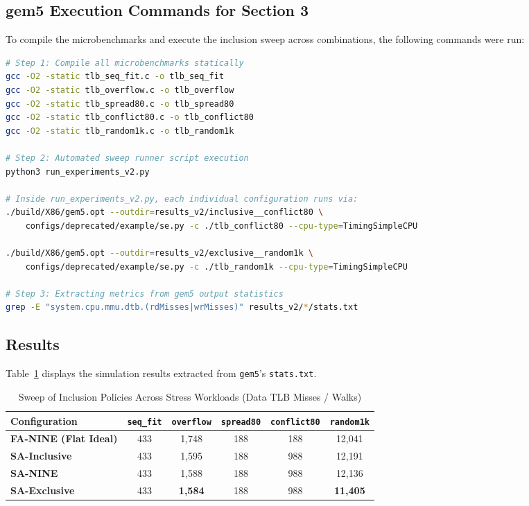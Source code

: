 \subsection{gem5 Execution Commands for Section 3}
To compile the microbenchmarks and execute the inclusion sweep across combinations, the following commands were run:

\begin{lstlisting}[float=H,language=bash,caption={Compilation and Execution Commands for Inclusion Policy Sweep in \texttt{gem5}},label={lst:cmd_inclusion}]
# Step 1: Compile all microbenchmarks statically
gcc -O2 -static tlb_seq_fit.c -o tlb_seq_fit
gcc -O2 -static tlb_overflow.c -o tlb_overflow
gcc -O2 -static tlb_spread80.c -o tlb_spread80
gcc -O2 -static tlb_conflict80.c -o tlb_conflict80
gcc -O2 -static tlb_random1k.c -o tlb_random1k

# Step 2: Automated sweep runner script execution
python3 run_experiments_v2.py

# Inside run_experiments_v2.py, each individual configuration runs via:
./build/X86/gem5.opt --outdir=results_v2/inclusive__conflict80 \
    configs/deprecated/example/se.py -c ./tlb_conflict80 --cpu-type=TimingSimpleCPU

./build/X86/gem5.opt --outdir=results_v2/exclusive__random1k \
    configs/deprecated/example/se.py -c ./tlb_random1k --cpu-type=TimingSimpleCPU

# Step 3: Extracting metrics from gem5 output statistics
grep -E "system.cpu.mmu.dtb.(rdMisses|wrMisses)" results_v2/*/stats.txt
\end{lstlisting}

\subsection{Results}
Table~\ref{tab:inclusion_sweep} displays the simulation results extracted from \texttt{gem5}'s \texttt{stats.txt}.

\begin{table}[H]
\centering
\small
\caption{Sweep of Inclusion Policies Across Stress Workloads (Data TLB Misses / Walks)}
\label{tab:inclusion_sweep}
\begin{tabularx}{\textwidth}{lccccc}
\toprule
\textbf{Configuration} & \textbf{\texttt{seq\_fit}} & \textbf{\texttt{overflow}} & \textbf{\texttt{spread80}} & \textbf{\texttt{conflict80}} & \textbf{\texttt{random1k}} \\
\midrule
\textbf{FA-NINE (Flat Ideal)} & 433 & 1,748 & 188 & 188 & 12,041 \\
\textbf{SA-Inclusive} & 433 & 1,595 & 188 & 988 & 12,191 \\
\textbf{SA-NINE} & 433 & 1,588 & 188 & 988 & 12,136 \\
\textbf{SA-Exclusive} & 433 & \textbf{1,584} & 188 & 988 & \textbf{11,405} \\
\bottomrule
\end{tabularx}
\end{table}

